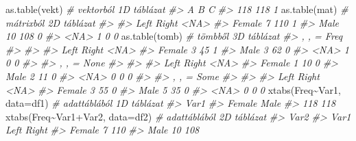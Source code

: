 \documentclass[
]{book}
\newenvironment{Shaded}{\begin{snugshade}}{\end{snugshade}}
\newcommand{\AttributeTok}[1]{\textcolor[rgb]{0.77,0.63,0.00}{#1}}
\newcommand{\CommentTok}[1]{\textcolor[rgb]{0.56,0.35,0.01}{\textit{#1}}}
\newcommand{\FunctionTok}[1]{\textcolor[rgb]{0.00,0.00,0.00}{#1}}
\newcommand{\NormalTok}[1]{#1}
\newcommand{\SpecialCharTok}[1]{\textcolor[rgb]{0.00,0.00,0.00}{#1}}
\begin{document}
\begin{Shaded}
\begin{Highlighting}[]
\FunctionTok{as.table}\NormalTok{(vekt) }\CommentTok{\# vektorból 1D táblázat}
\CommentTok{\#\textgreater{}   A   B   C }
\CommentTok{\#\textgreater{} 118 118   1}
\FunctionTok{as.table}\NormalTok{(mat)  }\CommentTok{\# mátrixból 2D táblázat}
\CommentTok{\#\textgreater{}         }
\CommentTok{\#\textgreater{}          Left Right \textless{}NA\textgreater{}}
\CommentTok{\#\textgreater{}   Female    7   110    1}
\CommentTok{\#\textgreater{}   Male     10   108    0}
\CommentTok{\#\textgreater{}   \textless{}NA\textgreater{}      1     0    0}
\FunctionTok{as.table}\NormalTok{(tomb) }\CommentTok{\# tömbből 3D táblázat  }
\CommentTok{\#\textgreater{} , ,  = Freq}
\CommentTok{\#\textgreater{} }
\CommentTok{\#\textgreater{}         }
\CommentTok{\#\textgreater{}          Left Right \textless{}NA\textgreater{}}
\CommentTok{\#\textgreater{}   Female    3    45    1}
\CommentTok{\#\textgreater{}   Male      3    62    0}
\CommentTok{\#\textgreater{}   \textless{}NA\textgreater{}      1     0    0}
\CommentTok{\#\textgreater{} }
\CommentTok{\#\textgreater{} , ,  = None}
\CommentTok{\#\textgreater{} }
\CommentTok{\#\textgreater{}         }
\CommentTok{\#\textgreater{}          Left Right \textless{}NA\textgreater{}}
\CommentTok{\#\textgreater{}   Female    1    10    0}
\CommentTok{\#\textgreater{}   Male      2    11    0}
\CommentTok{\#\textgreater{}   \textless{}NA\textgreater{}      0     0    0}
\CommentTok{\#\textgreater{} }
\CommentTok{\#\textgreater{} , ,  = Some}
\CommentTok{\#\textgreater{} }
\CommentTok{\#\textgreater{}         }
\CommentTok{\#\textgreater{}          Left Right \textless{}NA\textgreater{}}
\CommentTok{\#\textgreater{}   Female    3    55    0}
\CommentTok{\#\textgreater{}   Male      5    35    0}
\CommentTok{\#\textgreater{}   \textless{}NA\textgreater{}      0     0    0}
\FunctionTok{xtabs}\NormalTok{(Freq}\SpecialCharTok{\textasciitilde{}}\NormalTok{Var1, }\AttributeTok{data=}\NormalTok{df1)           }\CommentTok{\# adattáblából 1D táblázat}
\CommentTok{\#\textgreater{} Var1}
\CommentTok{\#\textgreater{} Female   Male }
\CommentTok{\#\textgreater{}    118    118}
\FunctionTok{xtabs}\NormalTok{(Freq}\SpecialCharTok{\textasciitilde{}}\NormalTok{Var1}\SpecialCharTok{+}\NormalTok{Var2, }\AttributeTok{data=}\NormalTok{df2)      }\CommentTok{\# adattáblából 2D táblázat}
\CommentTok{\#\textgreater{}         Var2}
\CommentTok{\#\textgreater{} Var1     Left Right}
\CommentTok{\#\textgreater{}   Female    7   110}
\CommentTok{\#\textgreater{}   Male     10   108}

\end{Highlighting}
\end{Shaded}
\end{document}
